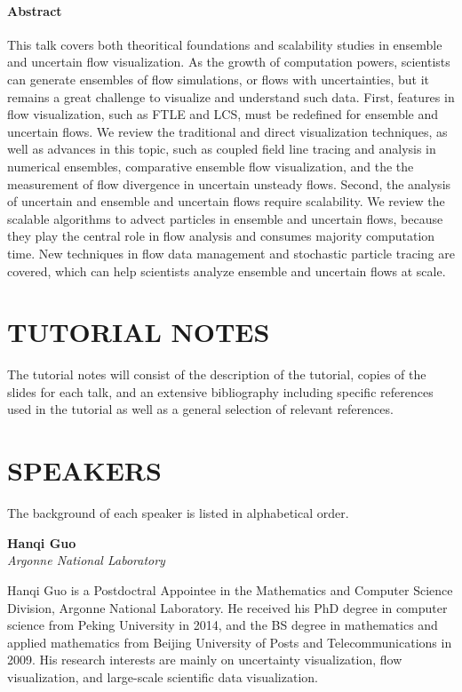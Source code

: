 \documentclass[preprint,journal]{vgtc}       %
\newcommand{\addverticalspace}{\vspace{3mm}}
\begin{document}
\paragraph{Abstract}
This talk covers both theoritical foundations and scalability studies in 
ensemble and uncertain flow visualization. 
As the growth of computation powers, scientists can generate ensembles of flow simulations, or flows with uncertainties, but it remains a great challenge to visualize and understand such data. 
First, features in flow visualization, such as FTLE and LCS, must be redefined for ensemble and uncertain flows.  
We review the traditional and direct visualization techniques, as well as advances in this topic, such as coupled field line tracing and analysis in numerical ensembles, comparative ensemble flow visualization, and the the measurement of flow divergence in uncertain unsteady flows. 
Second, the analysis of uncertain and ensemble and uncertain flows require scalability. 
We review the scalable algorithms to advect particles in ensemble and uncertain flows, 
because they play the central role in flow analysis and consumes majority computation time. 
New techniques in flow data management and stochastic particle tracing are covered, which can help scientists analyze ensemble and uncertain flows at scale. 


\section*{TUTORIAL NOTES}
The tutorial notes will consist of the description of the tutorial, copies of the slides for each talk, and an extensive bibliography including specific references used in the tutorial as well as a general selection of relevant references.

\section*{SPEAKERS}
The background of each speaker is listed in alphabetical order.

\addverticalspace

\noindent \textbf{Hanqi Guo}\\
\emph{Argonne National Laboratory}

\addverticalspace

Hanqi Guo is a Postdoctral Appointee in the Mathematics and Computer Science Division, Argonne National Laboratory. He received his PhD degree in computer science from Peking University in 2014, and the BS degree in mathematics and applied mathematics from Beijing University of Posts and Telecommunications in 2009. His research interests are mainly on uncertainty visualization, flow visualization, and large-scale scientific data visualization.
\end{document}

